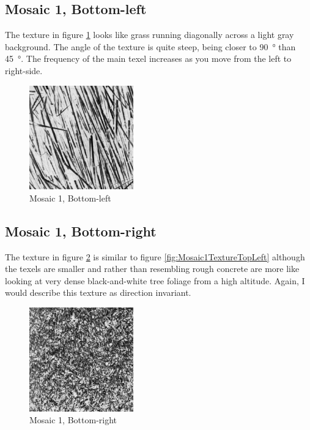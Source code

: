 \documentclass[a4paper,12pt,titlepage]{article}
\begin{document}
\subsection*{Mosaic 1, Bottom-left}
The texture in figure \ref{fig:Mosaic1TextureBottomLeft} looks like grass running diagonally across a light gray background. The angle of the texture is quite steep, being closer to \SI{90}{\degree} than \SI{45}{\degree}. The frequency of the main texel increases as you move from the left to right-side.

\begin{figure}[H]
\includegraphics[width=0.4\textwidth]{textures/mosaic1-subimage-bottom-left}
\caption{Mosaic 1, Bottom-left}
\label{fig:Mosaic1TextureBottomLeft}
\end{figure}

\subsection*{Mosaic 1, Bottom-right}
The texture in figure \ref{fig:Mosaic1TextureBottomRight} is similar to figure \ref{fig:Mosaic1TextureTopLeft} although the texels are smaller and rather than resembling rough concrete are more like looking at very dense black-and-white tree foliage from a high altitude. Again, I would describe this texture as direction invariant.

\begin{figure}[H]
\includegraphics[width=0.4\textwidth]{textures/mosaic1-subimage-bottom-right}
\caption{Mosaic 1, Bottom-right}
\label{fig:Mosaic1TextureBottomRight}
\end{figure}
\end{document}
